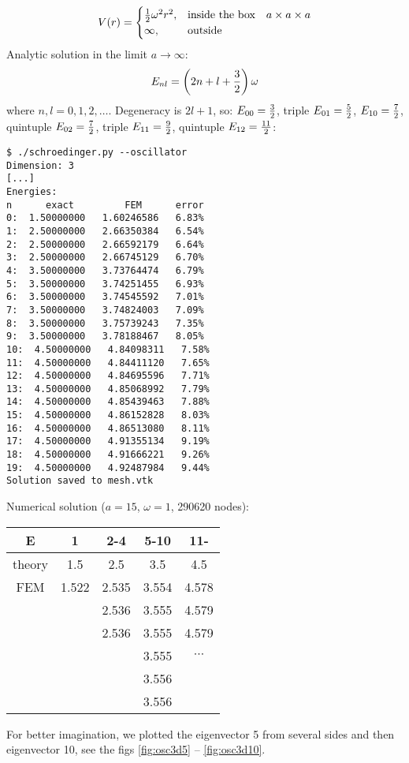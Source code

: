 $$V(r)=\begin{cases}{\textstyle{1\over2}}\omega^2r^2,&\text{inside the box}\quad a\times a\times a \\
\infty, & \text{outside}\end{cases}$$
Analytic solution in the limit $a\to\infty$:
$$E_{nl}=\left(2n+l+{3\over2}\right)\omega$$
where $n, l = 0, 1, 2, \dots$.
Degeneracy is $2l+1$, so:
$E_{00} = {3\over2}$,
triple $E_{01} = {5\over2}$,
$E_{10} = {7\over2}$,
quintuple $E_{02} = {7\over2}$,
triple $E_{11} = {9\over2}$,
quintuple $E_{12} = {11\over2}$:

\begin{lstlisting}
$ ./schroedinger.py --oscillator
Dimension: 3
[...]
Energies:
n      exact         FEM      error
0:  1.50000000   1.60246586   6.83%
1:  2.50000000   2.66350384   6.54%
2:  2.50000000   2.66592179   6.64%
3:  2.50000000   2.66745129   6.70%
4:  3.50000000   3.73764474   6.79%
5:  3.50000000   3.74251455   6.93%
6:  3.50000000   3.74545592   7.01%
7:  3.50000000   3.74824003   7.09%
8:  3.50000000   3.75739243   7.35%
9:  3.50000000   3.78188467   8.05%
10:  4.50000000   4.84098311   7.58%
11:  4.50000000   4.84411120   7.65%
12:  4.50000000   4.84695596   7.71%
13:  4.50000000   4.85068992   7.79%
14:  4.50000000   4.85439463   7.88%
15:  4.50000000   4.86152828   8.03%
16:  4.50000000   4.86513080   8.11%
17:  4.50000000   4.91355134   9.19%
18:  4.50000000   4.91666221   9.26%
19:  4.50000000   4.92487984   9.44%
Solution saved to mesh.vtk
\end{lstlisting}

Numerical solution ($a=15$, $\omega=1$, 290620 nodes):

\begin{tabular}{ c | c c c c }
E      & 1 & 2-4 & 5-10 & 11- \\
\hline
theory & 1.5 & 2.5 & 3.5 & 4.5 \\
FEM    & 1.522 & 2.535 & 3.554 & 4.578 \\
       &        & 2.536 & 3.555 & 4.579 \\
       &        & 2.536 & 3.555 & 4.579 \\
       &        &       & 3.555 &  $\cdots$ \\
       &        &       & 3.556 &   \\
       &        &       & 3.556 &   \\
\end{tabular}

For better imagination, we plotted the eigenvector 5 from several sides and then
eigenvector 10, see the figs \ref{fig:osc3d5} -- \ref{fig:osc3d10}.

